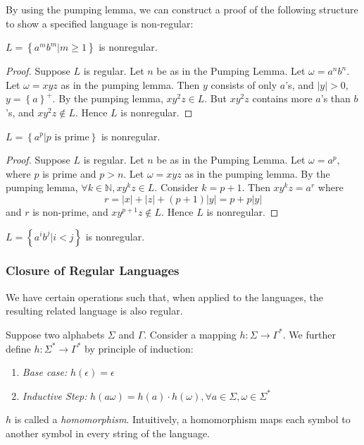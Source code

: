 By using the pumping lemma, we can construct a proof of the following structure
to show a specified language is non-regular:
\begin{prop}
  $L=\left\{ a^{m}b^{m}|m\ge 1 \right\}$ is nonregular.
\end{prop}
\begin{proof}
  Suppose $L$ is regular. Let $n$ be as in the Pumping Lemma. Let
  $\omega=a^{n}b^{n}$. Let $\omega=xyz$ as in the pumping lemma. Then $y$
  consists of only $a$'s, and $\left| y \right| >0$, $y={\left\{ a
  \right\}}^{+}$. By the pumping lemma, $xy^{2}z\in L$. But $xy^{2}z$ contains
  more $a$'s than $b$'s, and $xy^{2}z\notin L$. Hence $L$ is nonregular.
\end{proof}
\begin{prop}
  $L=\left\{ a^{p}|p\text{ is prime} \right\}$ is nonregular.
\end{prop}
\begin{proof}
  Suppose $L$ is regular. Let $n$ be as in the Pumping Lemma. Let
  $\omega=a^{p}$, where $p$ is prime and $p>n$. Let $\omega=xyz$ as in the
  pumping lemma. By the pumping lemma, $\forall k\in \mathbb{N}, xy^{k}z\in L$. Consider
  $k=p+1$. Then $xy^{k}z=a^{r}$ where 
  \[r=\left| x \right| +\left| z \right| +\left( p+1 \right) \left| y \right| =p+p\left| y \right|  \]
  and $r$ is non-prime,  and $xy^{p+1}z\notin L$. Hence $L$ is nonregular.
\end{proof}
\begin{prop}
  $L= \left\{a^i b^j | i < j\right\}$ is nonregular.
\end{prop}

\subsubsection{Closure of Regular Languages}
We have certain operations such that, when applied to the languages, the
resulting related language is also regular.

\begin{definition}[Homomorphism]
  Suppose two alphabets $\Sigma$ and $\Gamma$. Consider a mapping
  $h:\Sigma\to\Gamma^{*}$. We further define $h:\Sigma^{*}\to\Gamma^{*}$ by
  principle of induction:
  \begin{enumerate}
    \item \textit{Base case:}
      $h(\epsilon)=\epsilon$
    \item \textit{Inductive Step:}
      $h(a\omega)=h(a)\cdot h(\omega), \forall a\in \Sigma,\omega\in \Sigma^{*}$ 
  \end{enumerate}
  $h$ is called a \textit{homomorphism}. Intuitively, a homomorphism maps each
  symbol to another symbol in every string of the language.
\end{definition}


